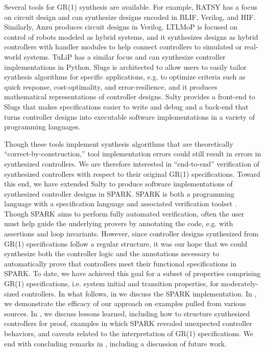 \documentclass[runningheads]{llncs}
\begin{document}
Several tools for GR(1) synthesis are available. 
For example, RATSY %
\cite{bloem2010ratsy} has a focus on circuit design and can synthesize designs 
encoded in BLIF, %
Verilog, and HIF. %
Similarly, Anzu \cite{jobstmann2007anzu} produces circuit designs in Verilog.
LTLMoP 
\cite{finucane2010ltlmop} is focused on control of robots modeled as hybrid systems, 
and it synthesizes designs as hybrid controllers with handler modules to help connect controllers to simulated or real-world systems. 
TuLiP 
\cite{TuLiP2011} has a similar focus and can synthesize controller implementations in Python. 
Slugs 
\cite{Ehlers2016} is architected to allow users to easily tailor synthesis algorithms for specific applications,
 e.g. to optimize criteria such as quick response, cost-optimality, and error-resilience, and it produces mathematical representations of controller designs.
Salty \cite{elliott2019salty} provides a front-end to Slugs that makes specifications easier to write and debug and 
a back-end that turns controller designs into executable software implementations in a variety of programming languages.

Though these tools implement synthesis algorithms that are theoretically ``correct-by-construction,'' 
tool implementation errors could still result in errors in synthesized controllers. 
We are therefore interested in ``end-to-end'' verification of synthesized controllers with respect to their original GR(1) specifications. 
Toward this end, we have extended Salty to produce software implementations of synthesized controller designs in SPARK. 
SPARK is both a programming language with a specification language and associated verification toolset \cite{hoang2015spark}. 
Though SPARK aims to perform fully automated verification, often the user must help guide the underlying provers by
annotating the code, e.g. with assertions and loop invariants. 
However, since controller designs synthesized from GR(1) specifications follow a regular structure, it was our hope that we could 
synthesize both the controller logic and the annotations necessary to automatically prove that controllers meet their functional specifications in SPARK. 
To date, we have achieved this goal for a subset of properties comprising GR(1) specifications, 
i.e. system initial and transition properties, for moderately-sized controllers.
In what follows, in  we discuss the SPARK implementation. 
In , we demonstrate the efficacy of our approach on examples pulled from various sources.
In , we discuss lessons learned, including how to structure synthesized controllers for proof, 
examples in which SPARK revealed unexpected controller behaviors, and caveats related to the interpretation of GR(1) specifications. 
We end with concluding remarks in , including a discussion of future work.
\end{document}
